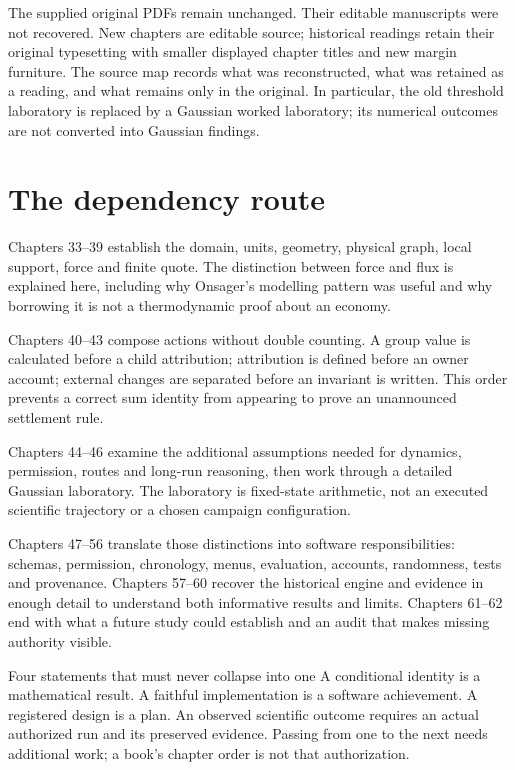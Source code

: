 The supplied original PDFs remain unchanged. Their editable manuscripts were
not recovered. New chapters are editable source; historical readings retain
their original typesetting with smaller displayed chapter titles and new
margin furniture. The source map records what was reconstructed, what was
retained as a reading, and what remains only in the original. In particular,
the old threshold laboratory is replaced by a Gaussian worked laboratory;
its numerical outcomes are not converted into Gaussian findings.

\chapter*{The dependency route}
Chapters 33--39 establish the domain, units, geometry, physical graph, local
support, force and finite quote. The distinction between force and flux is
explained here, including why Onsager's modelling pattern was useful and
why borrowing it is not a thermodynamic proof about an economy.

Chapters 40--43 compose actions without double counting. A group value is
calculated before a child attribution; attribution is defined before an
owner account; external changes are separated before an invariant is written.
This order prevents a correct sum identity from appearing to prove an
unannounced settlement rule.

Chapters 44--46 examine the additional assumptions needed for dynamics,
permission, routes and long-run reasoning, then work through a detailed
Gaussian laboratory. The laboratory is fixed-state arithmetic, not an
executed scientific trajectory or a chosen campaign configuration.

Chapters 47--56 translate those distinctions into software responsibilities:
schemas, permission, chronology, menus, evaluation, accounts, randomness,
tests and provenance. Chapters 57--60 recover the historical engine and
evidence in enough detail to understand both informative results and limits.
Chapters 61--62 end with what a future study could establish and an audit
that makes missing authority visible.

\begin{lawbox}{Four statements that must never collapse into one}
A conditional identity is a mathematical result. A faithful implementation
is a software achievement. A registered design is a plan. An observed
scientific outcome requires an actual authorized run and its preserved
evidence. Passing from one to the next needs additional work; a book's
chapter order is not that authorization.
\end{lawbox}

